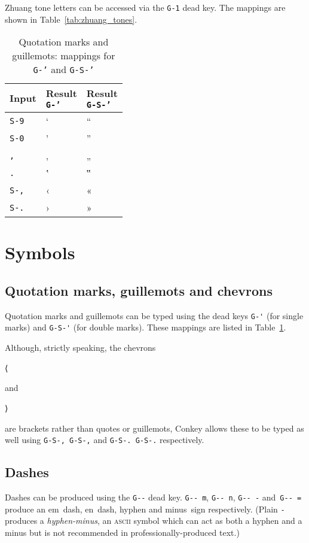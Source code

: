 \documentclass[oneside]{memoir}
\newcommand{\key}{\verb}
\newcommand{\keynv}{\texttt}
\newcommand{\out}[1]{\colorbox{gray!20}{\strut{}#1}}
\begin{document}
Zhuang tone letters can be accessed via the \key|G-1| dead key.
The mappings are shown in Table~\ref{tab:zhuang_tones}.

\begin{table}[t]
\caption{Quotation marks and guillemots: mappings for \keynv{G-'} and \keynv{G-S-'}}
\label{tab:quotes_guillemots}
\centering
\begin{tabular}{lll}
\toprule
Input & \makecell{Result\\\keynv{G-'}} & \makecell{Result\\\keynv{G-S-'}} \\
\midrule
\key|S-9| & ‘ & “ \\
\key|S-0| & ’ & ” \\
\key|,|   & ‚ & „ \\
\key|.|   & ‛ & ‟ \\
\key|S-,| & ‹ & « \\
\key|S-.| & › & » \\
\bottomrule
\end{tabular}
\end{table}

\section{Symbols}
\label{sec:symbols}

\subsection{Quotation marks, guillemots and chevrons}
\label{sec:quotation_marks_guillemots_chevrons}

Quotation marks and guillemots can be typed using the dead keys
  \key|G-'| (for single marks) and \key|G-S-'| (for double marks).
These mappings are listed in Table~\ref{tab:quotes_guillemots}.

Although, strictly speaking, the chevrons \out{⟨} and \out{⟩} are brackets rather than quotes or guillemots,
  Conkey allows these to be typed as well using \key|G-S-, G-S-,| and \key|G-S-. G-S-.| respectively.

\subsection{Dashes}
\label{sec:dashes}

Dashes can be produced using the \key|G--| dead key.
\key|G-- m|, \key|G-- n|, \key|G-- -| and~\key|G-- =|
  produce an em~dash, en~dash, hyphen and minus~sign respectively.
(Plain \key|-| produces a \textit{hyphen-minus},
  an \textsc{ascii} symbol which can act as both a hyphen and a minus
  but is not recommended in professionally-produced text.)
\end{document}
